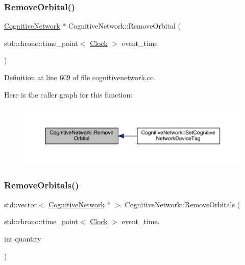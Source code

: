 \subsubsection{\texorpdfstring{Remove\+Orbital()}{RemoveOrbital()}}
{\footnotesize\ttfamily \hyperlink{class_cognitive_network}{Cognitive\+Network} $\ast$ Cognitive\+Network\+::\+Remove\+Orbital (\begin{DoxyParamCaption}\item[{std\+::chrono\+::time\+\_\+point$<$ \hyperlink{universe_8h_a0ef8d951d1ca5ab3cfaf7ab4c7a6fd80}{Clock} $>$}]{event\+\_\+time }\end{DoxyParamCaption})}



Definition at line 609 of file cognitivenetwork.\+cc.

Here is the caller graph for this function\+:
\nopagebreak
\begin{figure}[H]
\begin{center}
\leavevmode
\includegraphics[width=350pt]{class_cognitive_network_a6ed0e198f6dcfdd45d57df5d3ad5754c_icgraph}
\end{center}
\end{figure}
\mbox{\label{class_cognitive_network_af7834d400995607c2a5a5eac7b5e006d}} 
\subsubsection{\texorpdfstring{Remove\+Orbitals()}{RemoveOrbitals()}}
{\footnotesize\ttfamily std\+::vector$<$ \hyperlink{class_cognitive_network}{Cognitive\+Network} $\ast$ $>$ Cognitive\+Network\+::\+Remove\+Orbitals (\begin{DoxyParamCaption}\item[{std\+::chrono\+::time\+\_\+point$<$ \hyperlink{universe_8h_a0ef8d951d1ca5ab3cfaf7ab4c7a6fd80}{Clock} $>$}]{event\+\_\+time,  }\item[{int}]{quantity }\end{DoxyParamCaption})}




